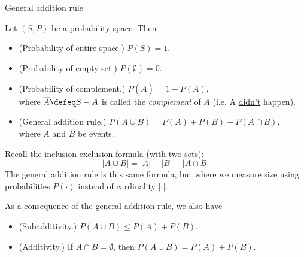 \documentclass[10pt]{beamer}
\begin{document}
\begin{frame}[standout]
General addition rule
\end{frame}

%
%
%
%	
%



\begin{frame}
\scriptsize 
\begin{mygreenbox}[title=\text{Proposition: Basic Properties of Probability}]
Let $(S,P)$ be a probability space. Then
\begin{itemize}
	\item[(a)] (Probability of entire space.) $P(S)=1$. 
	\item[(b)] (Probability of empty set.)  $P(\emptyset)=0$. 
	\item[(c)] (Probability of complement.) $P(\overline{A}) = 1-P(A)$, \\
		where $\overline{A} \defeq S-A$ is called the \textit{complement} of $A$ (i.e. A \underline{didn't} happen).
	\item[(d)]  (General addition rule.)  $P(A \cup B) = P(A) + P(B) - P(A \cap B)$, \\
	where $A$ and $B$ be events.
\end{itemize}
\end{mygreenbox}

\pause 
\vfill 
\begin{myredbox}[title=\text{Remark: General Addition Rule As Inclusion-Exclusion}]
Recall the inclusion-exclusion formula (with two sets):
\[ |A \cup B| = |A| + |B| - |A \cap B|\]
The general addition rule is this same formula, but where we measure size using probabilities $P(\cdot)$ instead of cardinality $|\cdot|$.
\end{myredbox}

\pause 
\vfill 
\begin{myyellowbox}[title=\text{Additional properties}]
As a consequence of the  general addition rule, we also have
\begin{itemize}
	\item[(e)] (Subadditivity.) $P(A \cup B) \leq P(A) + P(B)$. 
	\item[(f)] (Additivity.) If $A \cap B = \emptyset$, then  $P(A \cup B) = P(A) + P(B)$.
\end{itemize}
\end{myyellowbox}

\end{frame}
\end{document}
